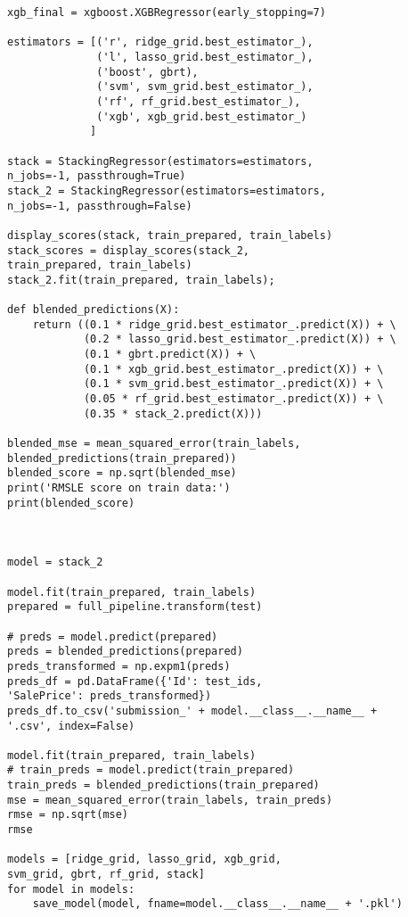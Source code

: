 \documentclass[12pt]{article}%
\begin{document}
\begin{lstlisting}
xgb_final = xgboost.XGBRegressor(early_stopping=7)

estimators = [('r', ridge_grid.best_estimator_),
              ('l', lasso_grid.best_estimator_),
              ('boost', gbrt),
              ('svm', svm_grid.best_estimator_),
              ('rf', rf_grid.best_estimator_),
              ('xgb', xgb_grid.best_estimator_)
             ]

stack = StackingRegressor(estimators=estimators, 
n_jobs=-1, passthrough=True)
stack_2 = StackingRegressor(estimators=estimators,
n_jobs=-1, passthrough=False)

display_scores(stack, train_prepared, train_labels)
stack_scores = display_scores(stack_2,
train_prepared, train_labels)
stack_2.fit(train_prepared, train_labels);

def blended_predictions(X):
    return ((0.1 * ridge_grid.best_estimator_.predict(X)) + \
            (0.2 * lasso_grid.best_estimator_.predict(X)) + \
            (0.1 * gbrt.predict(X)) + \
            (0.1 * xgb_grid.best_estimator_.predict(X)) + \
            (0.1 * svm_grid.best_estimator_.predict(X)) + \
            (0.05 * rf_grid.best_estimator_.predict(X)) + \
            (0.35 * stack_2.predict(X)))

blended_mse = mean_squared_error(train_labels,
blended_predictions(train_prepared))
blended_score = np.sqrt(blended_mse)
print('RMSLE score on train data:')
print(blended_score)



model = stack_2

model.fit(train_prepared, train_labels)
prepared = full_pipeline.transform(test)

# preds = model.predict(prepared)
preds = blended_predictions(prepared)
preds_transformed = np.expm1(preds)
preds_df = pd.DataFrame({'Id': test_ids, 
'SalePrice': preds_transformed})
preds_df.to_csv('submission_' + model.__class__.__name__ +
'.csv', index=False)

model.fit(train_prepared, train_labels)
# train_preds = model.predict(train_prepared)
train_preds = blended_predictions(train_prepared)
mse = mean_squared_error(train_labels, train_preds)
rmse = np.sqrt(mse)
rmse

models = [ridge_grid, lasso_grid, xgb_grid,
svm_grid, gbrt, rf_grid, stack]
for model in models:
    save_model(model, fname=model.__class__.__name__ + '.pkl')
\end{lstlisting}
\end{document}
